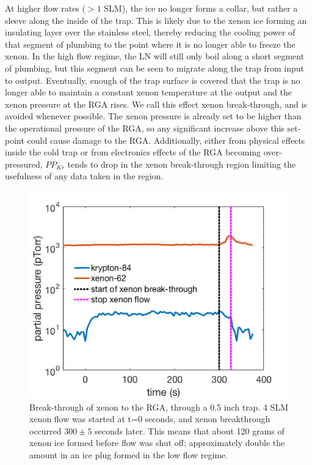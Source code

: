 At higher flow rates ($>1$ SLM), the ice no longer forms a collar, but rather a sleeve along the inside of the trap. This is likely due to the xenon ice forming an insulating layer over the stainless steel, thereby reducing the cooling power of that segment of plumbing to the point where it is no longer able to freeze the xenon. In the high flow regime, the LN will still only boil along a short segment of plumbing, but this segment can be seen to migrate along the trap from input to output. Eventually, enough of the trap surface is covered that the trap is no longer able to maintain a constant xenon temperature at the output and the xenon pressure at the RGA rises. We call this effect xenon break-through, and is avoided whenever possible. The xenon pressure is already set to be higher than the operational pressure of the RGA, so any significant increase above this set-point could cause damage to the RGA. Additionally, either from physical effects inside the cold trap or from electronics effects of the RGA becoming over-pressured, $PP_{Kr}$ tends to drop in the xenon break-through region limiting the usefulness of any data taken in the region.
\begin{figure}[h!]
\centering
\includegraphics[width=\textwidth]{Figures/xenon_breakthrough.png}
\caption{Break-through of xenon to the RGA, through a 0.5 inch trap. 4 SLM xenon flow was started at t=0 seconds, and xenon breakthrough occurred $300\pm5$ seconds later. This means that about 120 grams of xenon ice formed before flow was shut off; approximately double the amount in an ice plug formed in the low flow regime.}
\label{fig:breakthrough}
\end{figure} 


